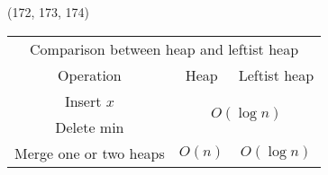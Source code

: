 \begin{theorem}{(172, 173, 174)}
\begin{itemize}
\begin{algorithm}[H]
\begin{algorithmic}[1]
                    \State {}
                \EndFunction
            \end{algorithmic}
        \end{algorithm}
        \begin{table}[H]
            \centering
            \begin{tabular}{|c|c|c|}
                \hline
                \multicolumn{3}{|c|}{Comparison between heap and leftist heap} \\
                \Xhline{3\arrayrulewidth}
                Operation & Heap & Leftist heap \\
                \Xhline{2\arrayrulewidth}
                Insert $x$ & \multicolumn{2}{c|}{\multirow{2}{*}{$O(\log n)$}} \\
                \cline{1-1}
                Delete min & \multicolumn{2}{c|}{} \\
                \hline
                Merge one or two heaps & $O(n)$ & $O(\log n)$ \\
                \hline
            \end{tabular}
        \end{table}
    \end{itemize}
\end{theorem}

